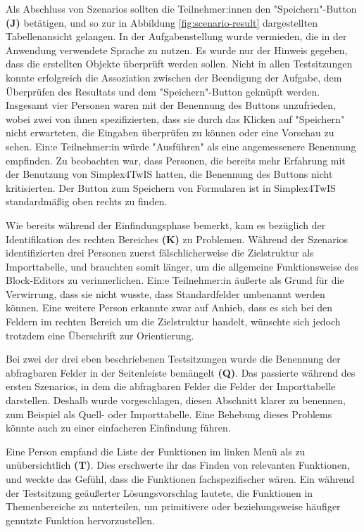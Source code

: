 Als Abschluss von Szenarios sollten die Teilnehmer:innen den "Speichern"-Button \textbf{(J)} betätigen, und so zur in Abbildung \ref{fig:scenario-result} dargestellten Tabellenansicht gelangen. In der Aufgabenstellung wurde vermieden, die in der Anwendung verwendete Sprache zu nutzen. Es wurde nur der Hinweis gegeben, dass die erstellten Objekte überprüft werden sollen. Nicht in allen Testsitzungen konnte erfolgreich die Assoziation zwischen der Beendigung der Aufgabe, dem Überprüfen des Resultats und dem "Speichern"-Button geknüpft werden. Insgesamt vier Personen waren mit der Benennung des Buttons unzufrieden, wobei zwei von ihnen spezifizierten, dass sie durch das Klicken auf "Speichern" nicht erwarteten, die Eingaben überprüfen zu können oder eine Vorschau zu sehen. Ein:e Teilnehmer:in würde "Ausführen" als eine angemessenere Benennung empfinden. Zu beobachten war, dass Personen, die bereits mehr Erfahrung mit der Benutzung von Simplex4TwIS hatten, die Benennung des Buttons nicht kritisierten. Der Button zum Speichern von Formularen ist in Simplex4TwIS standardmäßig oben rechts zu finden.

Wie bereits während der Einfindungsphase bemerkt, kam es bezüglich der Identifikation des rechten Bereiches \textbf{(K)} zu Problemen. Während der Szenarios identifizierten drei Personen zuerst fälschlicherweise die Zielstruktur als Importtabelle, und brauchten somit länger, um die allgemeine Funktionsweise des Block-Editors zu verinnerlichen. Ein:e Teilnehmer:in äußerte als Grund für die Verwirrung, dass sie nicht wusste, dass Standardfelder umbenannt werden können. Eine weitere Person erkannte zwar auf Anhieb, dass es sich bei den Feldern im rechten Bereich um die Zielstruktur handelt, wünschte sich jedoch trotzdem eine Überschrift zur Orientierung.

Bei zwei der drei eben beschriebenen Testsitzungen wurde die Benennung der abfragbaren Felder in der Seitenleiste bemängelt \textbf{(Q)}. Das passierte während des ersten Szenarios, in dem die abfragbaren Felder die Felder der Importtabelle darstellen. Deshalb wurde vorgeschlagen, diesen Abschnitt klarer zu benennen, zum Beispiel als Quell- oder Importtabelle. Eine Behebung dieses Problems könnte auch zu einer einfacheren Einfindung führen.

Eine Person empfand die Liste der Funktionen im linken Menü als zu unübersichtlich \textbf{(T)}. Dies erschwerte ihr das Finden von relevanten Funktionen, und weckte das Gefühl, dass die Funktionen fachspezifischer wären. Ein während der Testsitzung geäußerter Lösungsvorschlag lautete, die Funktionen in Themenbereiche zu unterteilen, um primitivere oder beziehungsweise häufiger genutzte Funktion hervorzustellen.

